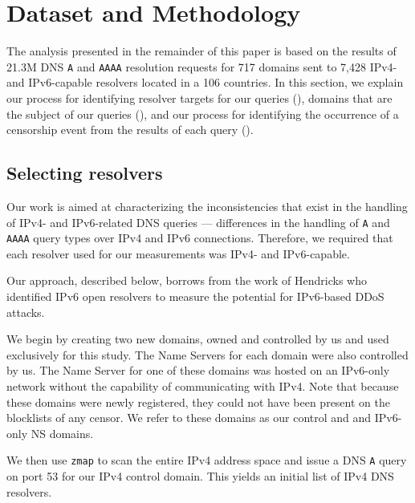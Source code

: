 \section{Dataset and Methodology}\label{sec:methodology}

The analysis presented in the remainder of this paper is based on the results
of 21.3M DNS {\tt A} and {\tt AAAA} resolution requests for 717 domains sent to
7,428 IPv4- and IPv6-capable resolvers located in a 106 countries. 
%
In this section, we explain our process for identifying resolver targets for
our queries (), domains that are the subject of
our queries (), and our process for identifying
the occurrence of a censorship event from the results of each query
().

\subsection{Selecting resolvers} \label{sec:methodology:resolvers}
%
Our work is aimed at characterizing the inconsistencies that exist in the
handling of IPv4- and IPv6-related DNS queries --- \ie differences in the
handling of {\tt A} and {\tt AAAA} query types over IPv4 and IPv6
connections. Therefore, we required that each resolver used for our
measurements was IPv4- and IPv6-capable.
%

Our approach, described below, borrows from the work of Hendricks \etal
\cite{hendriks2017potential} who identified IPv6 open resolvers to measure the
potential for IPv6-based DDoS attacks. 

We begin by creating two new domains, owned and controlled by us and used
exclusively for this study. The Name Servers for each domain were also
controlled by us. The Name Server for one of these domains was hosted on
an IPv6-only network without the capability of communicating with IPv4. 
%
Note that because these domains were newly registered, they could not have been
present on the blocklists of any censor. We refer to these domains as our
{control and and IPv6-only NS domains}.
%

We then use {\tt zmap} \cite{Durumeric13zmap} to scan the entire IPv4 address
space and issue a DNS {\tt A} query on port 53 for our IPv4 control
domain. This yields an initial list of IPv4 DNS resolvers.
%

